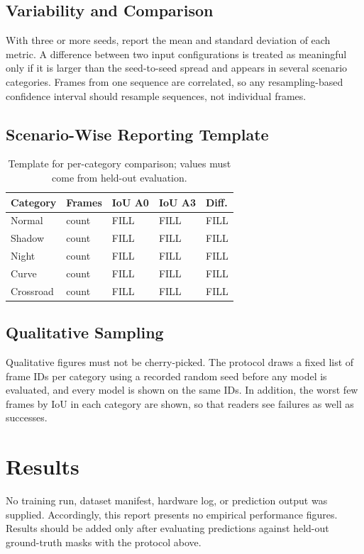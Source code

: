 \documentclass[10pt,a4paper,twocolumn]{article}
\begin{document}
\subsection{Variability and Comparison}\label{sec:variability}
With three or more seeds, report the mean and standard deviation of each metric. A difference between two input configurations is treated as meaningful only if it is larger than the seed-to-seed spread and appears in several scenario categories. Frames from one sequence are correlated, so any resampling-based confidence interval should resample sequences, not individual frames.

\subsection{Scenario-Wise Reporting Template}
\begin{table}[H]
\centering
\caption{Template for per-category comparison; values must come from held-out evaluation.}
\footnotesize
\begin{tabular}{|l|l|l|l|l|}
\hline
\rowcolor{gray!18}\textbf{Category}&\textbf{Frames}&\textbf{IoU A0}&\textbf{IoU A3}&\textbf{Diff.}\\ \hline
Normal & count & FILL & FILL & FILL\\ \hline
Shadow & count & FILL & FILL & FILL\\ \hline
Night & count & FILL & FILL & FILL\\ \hline
Curve & count & FILL & FILL & FILL\\ \hline
Crossroad & count & FILL & FILL & FILL\\ \hline
\end{tabular}
\end{table}

\subsection{Qualitative Sampling}
Qualitative figures must not be cherry-picked. The protocol draws a fixed list of frame IDs per category using a recorded random seed before any model is evaluated, and every model is shown on the same IDs. In addition, the worst few frames by IoU in each category are shown, so that readers see failures as well as successes.

\section{Results}\label{sec:results}
No training run, dataset manifest, hardware log, or prediction output was supplied. Accordingly, this report presents no empirical performance figures. Results should be added only after evaluating predictions against held-out ground-truth masks with the protocol above.
\end{document}
